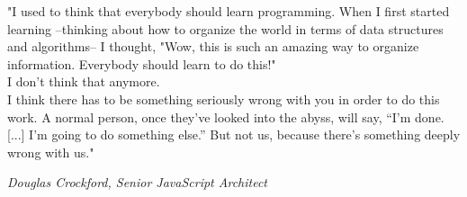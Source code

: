 \epigraph{"I used to think that everybody should learn programming. When I first started learning –thinking about how to organize the world in terms of data structures and algorithms– I thought, "Wow, this is such an amazing way to organize information. Everybody should learn to do this!" \\

I don't think that anymore. \\

I think there has to be something seriously wrong with you in order to do this work. A normal person, once they’ve looked into the abyss, will say, “I’m done.[...] I’m going to do something else.” But not us, because there’s something deeply wrong with us."}{\textit{Douglas Crockford, Senior JavaScript Architect}}